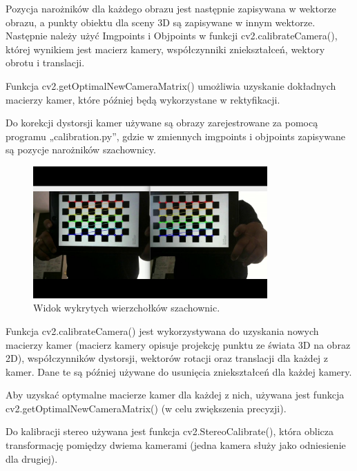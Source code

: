 \documentclass[magisterska]{pracadypl}
\begin{document}
Pozycja narożników dla każdego obrazu jest następnie zapisywana w wektorze obrazu, a punkty obiektu dla sceny 3D są zapisywane w innym wektorze. Następnie należy użyć Imgpoints i Objpoints w funkcji cv2.calibrateCamera(), której wynikiem jest macierz kamery, współczynniki zniekształceń, wektory obrotu i translacji.

Funkcja cv2.getOptimalNewCameraMatrix() umożliwia uzyskanie dokładnych macierzy kamer, które później będą wykorzystane w rektyfikacji.

Do korekcji dystorsji kamer używane są obrazy zarejestrowane za pomocą programu „calibration.py”, gdzie w zmiennych imgpoints i objpoints zapisywane są pozycje narożników szachownicy.

\begin{figure}[H]  %
    \centering  %
    \includegraphics[width=0.8\textwidth]{images/calib.jpg}  %
    \captionsetup{font=footnotesize}
    \caption[Widok wykrytych wierzchołków szachownic. https://learnopencv.com/making-a-low-cost-stereo-camera-using-opencv/.]{Widok wykrytych wierzchołków szachownic.}
\end{figure}

Funkcja cv2.calibrateCamera() jest wykorzystywana do uzyskania nowych macierzy kamer (macierz kamery opisuje projekcję punktu ze świata 3D na obraz 2D), współczynników dystorsji, wektorów rotacji oraz translacji dla każdej z kamer. Dane te są później używane do usunięcia zniekształceń dla każdej kamery.

Aby uzyskać optymalne macierze kamer dla każdej z nich, używana jest funkcja cv2.getOptimalNewCameraMatrix() (w celu zwiększenia precyzji).

Do kalibracji stereo używana jest funkcja cv2.StereoCalibrate(), która oblicza transformację pomiędzy dwiema kamerami (jedna kamera służy jako odniesienie dla drugiej).
\end{document}
